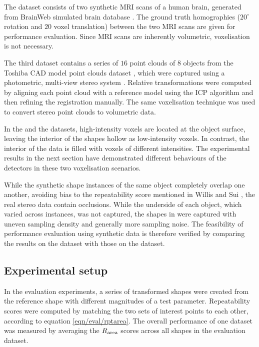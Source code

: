 The \mriset dataset consists of two synthetic MRI scans of a human brain, generated from BrainWeb simulated brain database \cite{Cocosco1997}. The ground truth homographies ($20^{\circ}$ rotation and $20$ voxel translation) between the two MRI scans are given for performance evaluation. Since MRI scans are inherently volumetric, voxelisation is not necessary. 

The third \stereoset dataset contains a series of $16$ point clouds of $8$ objects from the Toshiba CAD model point clouds dataset \cite{Pham2011}, which were captured using a photometric, multi-view stereo system \cite{Vogiatzis2011}. Relative transformations were computed by aligning each point cloud with a reference model using the ICP algorithm \cite{Besl1992} and then refining the registration manually. The same voxelisation technique was used to convert stereo point clouds to volumetric data.

In the \meshset and the \stereoset datasets, high-intensity voxels are located at the object surface, leaving the interior of the shapes hollow as low-intensity voxels. In contrast, the interior of the \mriset data is filled with voxels of different intensities. The experimental results in the next section have demonstrated different behaviours of the detectors in these two voxelisation scenarios.

While the synthetic shape instances of the same object completely overlap one another, avoiding bias to the repeatability score mentioned in Willis and Sui \cite{Willis2009}, the real stereo data contain occlusions. While the underside of each object, which varied across instances, was not captured, the shapes in \stereoset were captured with uneven sampling density and generally more sampling noise. The feasibility of performance evaluation using synthetic data is therefore verified by comparing the results on the \meshset dataset with those on the \stereoset dataset. 




\subsection{Experimental setup}
\label{sec/eval/variation}
In the evaluation experiments, a series of transformed shapes were created from the reference shape with different magnitudes of a test parameter. Repeatability scores were computed by matching the two sets of interest points to each other, according to equation \ref{eqn/eval/rptarea}. The overall performance of one dataset was measured by averaging the $R_\textrm{area}$ scores across all shapes in the evaluation dataset. 

